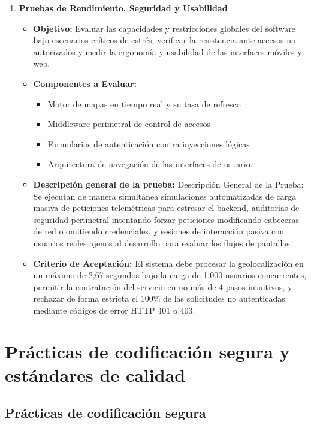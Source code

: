 \begin{enumerate}
\begin{itemize}
	\end{itemize}
	\item\textbf{Pruebas de Rendimiento, Seguridad y Usabilidad}
	\begin{itemize}
		\item\textbf{Objetivo:} Evaluar las capacidades y restricciones globales del software bajo escenarios críticos de estrés, verificar la resistencia ante accesos no autorizados y medir la ergonomía y usabilidad de las interfaces móviles y web.
		\item \textbf{Componentes a Evaluar:} 
		\begin{itemize}
			\item Motor de mapas en tiempo real y su tasa de refresco
			\item Middleware perimetral de control de accesos
			\item Formularios de autenticación contra inyecciones lógicas 
			\item Arquitectura de navegación de las interfaces de usuario.
		\end{itemize}
		\item \textbf{Descripción general de la prueba:} Descripción General de la Prueba: Se ejecutan de manera simultánea simulaciones automatizadas de carga masiva de peticiones telemétricas para estresar el backend, auditorías de seguridad perimetral intentando forzar peticiones modificando cabeceras de red o omitiendo credenciales, y sesiones de interacción pasiva con usuarios reales ajenos al desarrollo para evaluar los flujos de pantallas.
		\item \textbf{Criterio de Aceptación:} El sistema debe procesar la geolocalización en un máximo de 2,67 segundos bajo la carga de 1.000 usuarios concurrentes, permitir la contratación del servicio en no más de 4 pasos intuitivos, y rechazar de forma estricta el 100\% de las solicitudes no autenticadas mediante códigos de error HTTP 401 o 403.
	\end{itemize}
\end{enumerate}

\section{Prácticas de codificación segura y estándares de calidad }

\subsection{Prácticas de codificación segura} 

